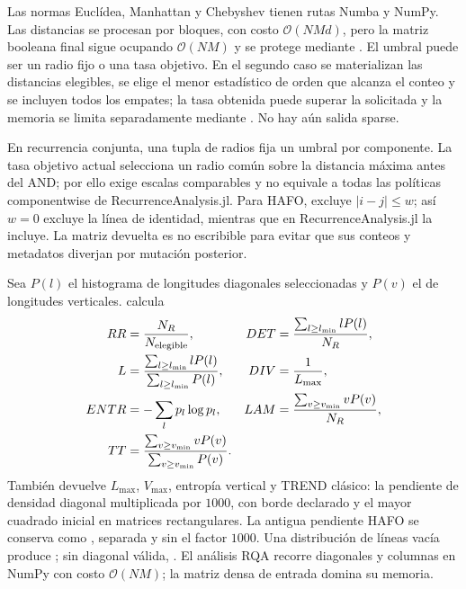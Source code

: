 Las normas Euclídea, Manhattan y Chebyshev tienen rutas Numba y NumPy. Las
distancias se procesan por bloques, con costo \(\mathcal O(NMd)\), pero la matriz booleana
final sigue ocupando \(\mathcal O(NM)\) y se protege mediante . El
umbral puede ser un radio fijo o una tasa objetivo. En el segundo caso se
materializan las distancias elegibles, se elige el menor estadístico de orden
que alcanza el conteo y se incluyen todos los empates; la tasa obtenida puede
superar la solicitada y la memoria se limita separadamente mediante
. No hay aún salida sparse.

En recurrencia conjunta, una tupla de radios fija un umbral por componente. La
tasa objetivo actual selecciona un radio común sobre la distancia máxima antes
del AND; por ello exige escalas comparables y no equivale a todas las políticas
componentwise de RecurrenceAnalysis.jl. Para HAFO,
 excluye \(|i-j|\le w\); así \(w=0\) excluye la línea
de identidad, mientras que en RecurrenceAnalysis.jl  la
incluye. La matriz devuelta es no escribible para evitar que sus conteos y
metadatos diverjan por mutación posterior.

Sea \(P(l)\) el histograma de longitudes diagonales seleccionadas y \(P(v)\) el
de longitudes verticales. 
calcula
\begin{align*}
 RR &= \frac{N_R}{N_{\rm elegible}},
 & DET &= \frac{\sum_{l\ge l_{\min}}lP(l)}{N_R},\\
 L &= \frac{\sum_{l\ge l_{\min}}lP(l)}{\sum_{l\ge l_{\min}}P(l)},
 & DIV &= \frac1{L_{\max}},\\
 ENTR &= -\sum_l p_l\log p_l,
 & LAM &= \frac{\sum_{v\ge v_{\min}}vP(v)}{N_R},\\
 TT &= \frac{\sum_{v\ge v_{\min}}vP(v)}{\sum_{v\ge v_{\min}}P(v)}.
\end{align*}
También devuelve \(L_{\max}\), \(V_{\max}\), entropía vertical y TREND clásico:
la pendiente de densidad diagonal multiplicada por \(1000\), con borde
declarado y el mayor cuadrado inicial en matrices rectangulares. La antigua
pendiente HAFO se conserva como , separada
y sin el factor \(1000\). Una distribución de líneas vacía produce
; sin diagonal válida, .
El análisis RQA recorre diagonales y columnas en NumPy con costo
\(\mathcal O(NM)\); la matriz densa de entrada domina su memoria.

